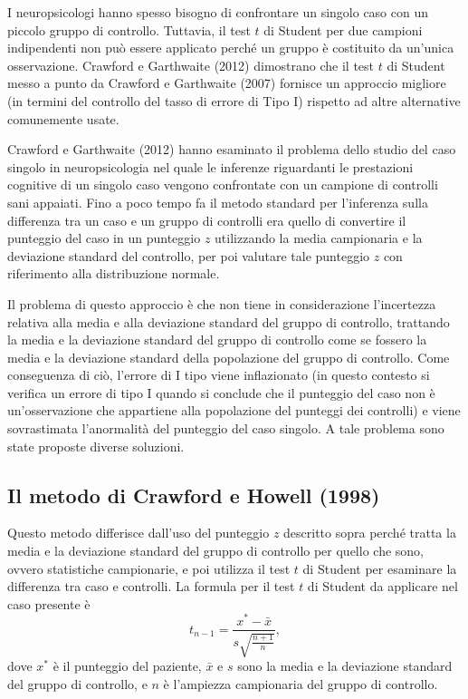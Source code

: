 I neuropsicologi hanno spesso bisogno di confrontare un singolo caso con un piccolo gruppo di controllo. 
Tuttavia, il test $t$ di Student per due campioni indipendenti non può essere applicato perché un gruppo è costituito da un'unica osservazione. 
Crawford e Garthwaite (2012) dimostrano che il test $t$ di Student messo a punto da Crawford e Garthwaite (2007) fornisce un approccio migliore (in termini del controllo del tasso di errore di Tipo I) rispetto ad altre alternative comunemente usate.

Crawford e Garthwaite (2012) hanno esaminato il problema dello studio del caso singolo in neuropsicologia nel quale le inferenze riguardanti le prestazioni cognitive di un singolo caso vengono confrontate con un campione di controlli sani appaiati. 
Fino a poco tempo fa il metodo standard per l'inferenza sulla differenza tra un caso e un gruppo di controlli era quello di convertire il punteggio del caso in un punteggio $z$ utilizzando la media campionaria e la deviazione standard del controllo, per poi valutare tale punteggio $z$ con riferimento alla distribuzione normale.

Il problema di questo approccio è che non tiene in considerazione l'incertezza relativa alla media e alla deviazione standard del gruppo di controllo, trattando la media e la deviazione standard del gruppo di controllo come se fossero la media e la deviazione standard della popolazione del gruppo di controllo. 
Come conseguenza di ciò, l'errore di I tipo viene inflazionato (in questo contesto si verifica un errore di tipo I quando si conclude che il punteggio del caso non è un'osservazione che appartiene alla popolazione del punteggi dei controlli) e viene sovrastimata l'anormalità del punteggio del caso singolo.
A tale problema sono state proposte diverse soluzioni.


\subsection{Il metodo di Crawford e Howell (1998)}
\label{sec:Crawford:Howell_1998}

Questo metodo differisce dall'uso del punteggio $z$ descritto sopra perché tratta la media e la deviazione standard del gruppo di controllo per quello che sono, ovvero statistiche campionarie, e poi utilizza il test $t$ di Student per esaminare la differenza tra caso e controlli.
La formula per il test $t$ di Student da applicare nel caso presente è
\begin{equation}
t_{n-1} = \frac{x^* - \bar{x}}{s \sqrt{\frac{n+1}{n}}},
\label{eq:Crawford_Howell_1998}
\end{equation}
dove $x^*$ è il punteggio del paziente, $\bar{x}$ e $s$ sono la media e la deviazione standard del gruppo di controllo, e $n$ è l'ampiezza campionaria del gruppo di controllo.

